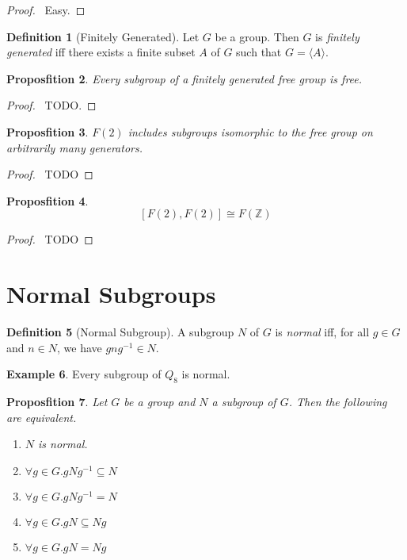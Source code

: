\documentclass{book}
\let\qed\relax
\newtheorem{prop}{Proposfition}[chapter]
\theoremstyle{definition}
\newtheorem{df}[prop]{Definition}
\newtheorem{ex}[prop]{Example}
\newcommand{\inv}[1]{\ensuremath{{#1}^{-1}}}
\begin{document}
\begin{proof}
\pf\ Easy. \qed
\end{proof}

\begin{df}[Finitely Generated]
Let $G$ be a group. Then $G$ is \emph{finitely generated} iff there exists a finite subset $A$ of $G$ such that $G = \langle A \rangle$.
\end{df}

\begin{prop}
Every subgroup of a finitely generated free group is free.
\end{prop}

\begin{proof}
\pf\ TODO.
\end{proof}

\begin{prop}
$F(2)$ includes subgroups isomorphic to the free group on arbitrarily many generators.
\end{prop}

\begin{proof}
\pf\ TODO
\end{proof}

\begin{prop}
\[ [F(2),F(2)] \cong F(\mathbb{Z}) \]
\end{prop}

\begin{proof}
\pf\ TODO
\end{proof}

\section{Normal Subgroups}

\begin{df}[Normal Subgroup]
A subgroup $N$ of $G$ is \emph{normal} iff, for all $g \in G$ and $n \in N$, we have $gn\inv{g} \in N$.
\end{df}

\begin{ex}
Every subgroup of $Q_8$ is normal.
\end{ex}

\begin{prop}
Let $G$ be a group and $N$ a subgroup of $G$. Then the following are equivalent.
\begin{enumerate}
\item $N$ is normal.
\item $\forall g \in G. g N \inv{g} \subseteq N$
\item $\forall g \in G. g N \inv{g} = N$
\item $\forall g \in G. g N \subseteq N g$
\item $\forall g \in G. gN = Ng$
\end{enumerate}
\end{prop}
\end{document}
